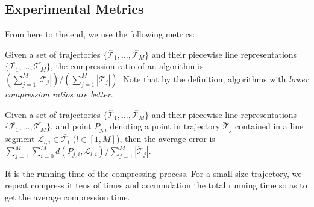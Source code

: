 \subsection{Experimental Metrics}

From here to the end, we use the following metrics:

\vspace{0.5ex}
 Given a set of trajectories $\{\dddot{\mathcal{T}_1}, \ldots, \dddot{\mathcal{T}_M}\}$ and their piecewise line representations $\{\overline{\mathcal{T}_1}, \ldots, \overline{\mathcal{T}_M}\}$, the compression ratio of an algorithm is $(\sum_{j=1}^{M} |\overline{\mathcal{T}}_j |)/(\sum_{j=1}^{M} |\dddot{\mathcal{T}}_j |)$.
Note that by the definition, algorithms with \emph{lower compression ratios are better}.

\vspace{0.5ex}
 Given a set of trajectories $\{\dddot{\mathcal{T}_1}, \ldots, \dddot{\mathcal{T}_M}\}$ and their piecewise line representations $\{\overline{\mathcal{T}_1}, \ldots, \overline{\mathcal{T}_M}\}$, and point $P_{j,i}$ denoting
a point in trajectory $\dddot{\mathcal{T}}_j$ contained in a line segment $\mathcal{L}_{l,i}\in\overline{\mathcal{T}_l}$ ($l\in[1,M]$),
then the average error is $\sum_{j=1}^{M}\sum_{i=0}^{M} d(P_{j,i},
\mathcal{L}_{l,i})/\sum_{j=1}^{M}{|\dddot{\mathcal{T}}_j |}$.

\vspace{1ex}
 It is the running time of the compressing process.
For a small size trajectory, we repeat compress it tens of times and accumulation the total running time so as to get the average compression time.






